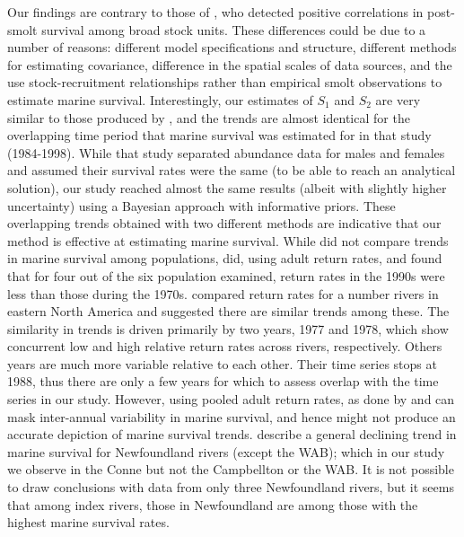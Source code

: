 \documentclass[12pt]{article}
\newcommand{\So}{$S_{1}$\xspace}
\newcommand{\St}{$S_{2}$\xspace}
\begin{document}
Our findings are contrary to those of \citet{Olmos2019}, who detected positive
correlations in post-smolt survival among broad stock units. These differences
could be due to a number of reasons: different model specifications and
structure, different methods for estimating covariance, difference in the
spatial scales of data sources, and the use stock-recruitment relationships
rather than empirical smolt observations to estimate marine survival.
Interestingly, our estimates of \So and \St are very similar to those produced
by \citet{Chaput2003b}, and the trends are almost identical for the
overlapping time period that marine survival was estimated for in that study
(1984-1998). While that study separated abundance data for males and females
and assumed their survival rates were the same (to be able to reach an
analytical solution), our study reached almost the same results (albeit with
slightly higher uncertainty) using a Bayesian approach with informative
priors. These overlapping trends obtained with two different methods are
indicative that our method is effective at estimating marine survival.
While \citet{Chaput2003b} did not compare trends in marine survival
among populations, \citet{Chaput2012a} did, using adult return rates, and
found that for four out of the six population examined, return rates in the 1990s 
were less than those during the 1970s.
\citet{Friedland1993} compared return rates for a number rivers in eastern
North America and suggested there are similar trends among these. The
similarity in trends is driven primarily by two years, 1977 and 1978, which
show concurrent low and high relative return rates across rivers,
respectively. Others years are much more variable relative to each other.
Their time series stops at 1988, thus there are only a few years for which 
to assess overlap with the time series in our study.
However, using pooled adult return rates, as done by \citet{Chaput2012a} and
\citet{Friedland1993} can mask inter-annual variability in marine survival,
and hence might not produce an accurate depiction of marine survival trends.
\citet{Dempson2003} describe a general declining trend in marine survival for
Newfoundland rivers (except the WAB); which in our study we observe in the
Conne but not the Campbellton or the WAB. It is not possible to draw conclusions
with data from only three Newfoundland rivers, but it seems that among index rivers,
those in Newfoundland are among those with the highest marine survival rates.
\end{document}
